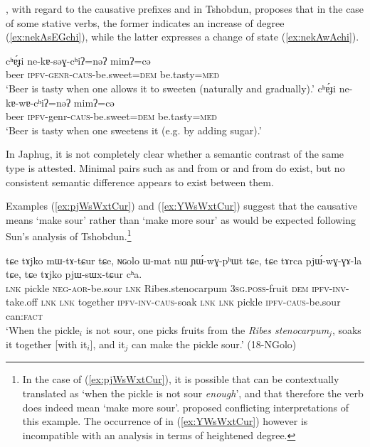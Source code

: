 \citet{jackson06paisheng, jackson14morpho}, with regard to the causative prefixes  and  in Tshobdun, proposes that in the case of some stative verbs, the former indicates an increase of degree (\ref{ex:nekAsEGchi}), while the latter expresses a change of state (\ref{ex:nekAwAchi}). 

\begin{exe}
\ex 
\begin{xlist}
\ex \label{ex:nekAsEGchi}
\gll cʰɐ́ɟi ne-kɐ-səɣ-cʰiʔ=nəʔ mimʔ=cə \\
beer \textsc{ipfv}-\textsc{genr}-\textsc{caus}-be.sweet=\textsc{dem} be.tasty=\textsc{med} \\
\glt ‘Beer is tasty when one allows it to sweeten (naturally and gradually).’
\ex \label{ex:nekAwAchi}
\gll cʰɐ́ɟi ne-kɐ-wɐ-cʰiʔ=nəʔ mimʔ=cə \\
beer \textsc{ipfv}-genr-\textsc{caus}-be.sweet=\textsc{dem} be.tasty=\textsc{med} \\
\glt ‘Beer is tasty when one sweetens it (e.g. by adding sugar).’
\end{xlist}
\end{exe}

In Japhug, it is not completely clear whether a semantic contrast of the same type is attested. Minimal pairs such as  and  from  or  and  from  do exist, but no consistent semantic difference appears to exist between them.

Examples (\ref{ex:pjWsWxtCur}) and (\ref{ex:YWsWxtCur}) suggest that the causative   means `make sour' rather than `make more sour' as would be expected following Sun's analysis of Tshobdun.\footnote{In the case of (\ref{ex:pjWsWxtCur}), it is possible that  can be contextually translated as `when the pickle is not sour \textit{enough}', and that therefore the verb  does indeed mean `make more sour'.  proposed conflicting interpretations of this example. The occurrence of  in (\ref{ex:YWsWxtCur}) however is incompatible with an analysis in terms of heightened degree. } 

 \begin{exe}
\ex \label{ex:pjWsWxtCur}
\gll tɕe tɤjko mɯ-tɤ-tɕur tɕe, ɴɢolo ɯ-mat nɯ ɲɯ́-wɣ-pʰɯt tɕe, tɕe tɤrca pjɯ́-wɣ-ɣɤ-la tɕe, tɕe tɤjko pjɯ-sɯx-tɕur cʰa. \\
\textsc{lnk} pickle \textsc{neg}-\textsc{aor}-be.sour \textsc{lnk}  Ribes.stenocarpum \textsc{3sg}.\textsc{poss}-fruit \textsc{dem} \textsc{ipfv}-\textsc{inv}-take.off \textsc{lnk} \textsc{lnk}  together \textsc{ipfv}-\textsc{inv}-\textsc{caus}-soak \textsc{lnk} \textsc{lnk} pickle \textsc{ipfv}-\textsc{caus}-be.sour can:\textsc{fact} \\
\glt `When the pickle$_i$ is not sour, one picks fruits from the \textit{Ribes stenocarpum}$_j$, soaks it together [with it$_i$], and it$_j$ can make the pickle sour.' (18-NGolo)
\end{exe}

